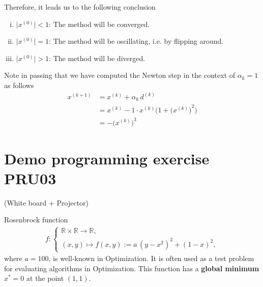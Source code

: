 \documentclass[12pt]{article}
\begin{document}
\begin{enumerate}[(i)]
		  \clearpage
	      Therefore, it leads us to the following conclusion
	      \begin{enumerate}[(i)]
		      \item \( \big| x^{(0)} \big| < 1 \): The method will be converged.
		      \item \( \big| x^{(0)} \big| = 1 \): The method will be oscillating, i.e. by flipping around.
		      \item \( \big| x^{(0)} \big| > 1 \): The method will be diverged.
	      \end{enumerate}
	      
	      Note in passing that we have computed the Newton step 
	      in the context of $\alpha_k = 1$ as follows
	      \begin{align}
		      x^{(k+1)}
		       & = x^{(k)} + \alpha_k \, d^{(k)}                                    \\
		       & = x^{(k)} - 1 \cdot x^{(k)} \Bigg(1 + {\Big(x^{(k)}\Big)}^2 \Bigg) \\
		       & = - \Big( x^{(k)} \Big)^3
	      \end{align}
\end{enumerate}


\clearpage
\section{Demo programming exercise PRU03}
 (White board + Projector)
\begin{remarkboxed}
	Rosenbrock function
	\begin{align}
		f:
		\begin{cases}
			\mathbb{R} \times \mathbb{R} \to \mathbb{R}, \\
			(x,y) \mapsto f(x,y) := a\, (y-x^2)^2 + (1-x)^2,
		\end{cases}
	\end{align}
	where $a=100$,
	is well-known in Optimization. It is often used as a test problem 
	for evaluating algorithms in Optimization.
	This function has a \textbf{global minimum} $x^* = 0$ at the point $(1,1)$.
\end{remarkboxed}



% 
\end{document}
